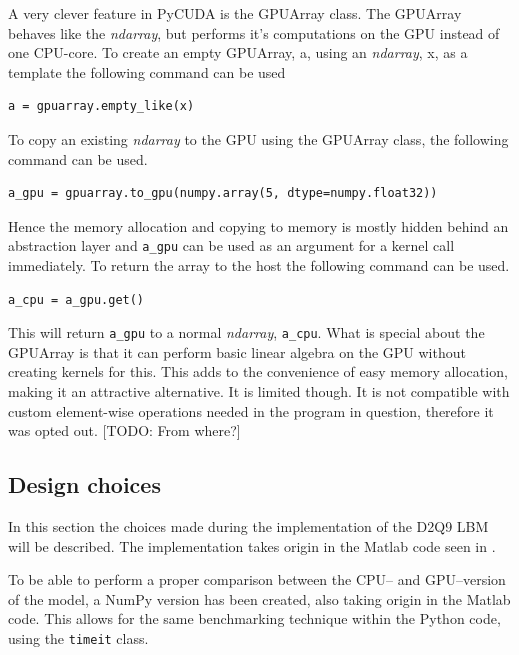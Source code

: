 A very clever feature in PyCUDA is the GPUArray class. The GPUArray behaves like the \textit{ndarray}, but performs it's computations on the GPU instead of one CPU-core. To create an empty GPUArray, a, using an \textit{ndarray}, x, as a template the following command can be used

\begin{verbatim}
a = gpuarray.empty_like(x)
\end{verbatim}

To copy an existing \textit{ndarray} to the GPU using the GPUArray class, the following command can be used.

\begin{verbatim}
a_gpu = gpuarray.to_gpu(numpy.array(5, dtype=numpy.float32))
\end{verbatim}

Hence the memory allocation and copying to memory is mostly hidden behind an abstraction layer and \texttt{a\_gpu} can be used as an argument for a kernel call immediately. To return the array to the host the following command can be used.

\begin{verbatim}
a_cpu = a_gpu.get()
\end{verbatim}

This will return \texttt{a\_gpu} to a normal \textit{ndarray}, \texttt{a\_cpu}. What is special about the GPUArray is that it can perform basic linear algebra on the GPU without creating kernels for this. This adds to the convenience of easy memory allocation, making it an attractive alternative. It is limited though. It is not compatible with custom element-wise operations needed in the program in question, therefore it was opted out. [TODO: From where?]



\subsection{Design choices}
In this section the choices made during the implementation of the D2Q9 LBM will be described. The implementation takes origin in the Matlab code seen in .

To be able to perform a proper comparison between the CPU-- and GPU--version of the model, a NumPy version has been created, also taking origin in the Matlab code. This allows for the same benchmarking technique within the Python code, using the \texttt{timeit} class.



